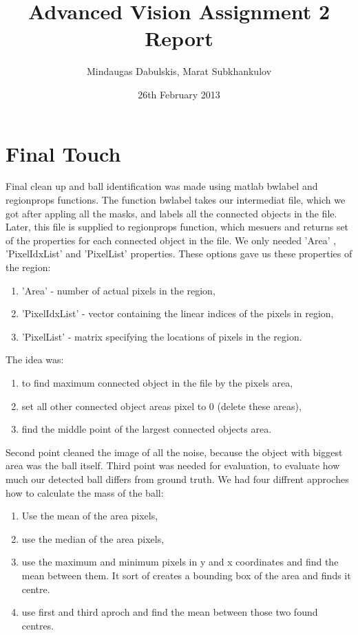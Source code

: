 \documentclass[10pt,a4paper,oneclumn]{article}
\title{Advanced Vision Assignment 2 Report}  %
\author{Mindaugas Dabulskis, Marat Subkhankulov}                      %
\date{26th February 2013}                 %
\begin{document}
\maketitle  %
%

\section{Final Touch}

Final clean up and ball identification was made using matlab bwlabel and regionprops functions. The function bwlabel takes our intermediat file, which we got after appling all the masks, and labels all the connected objects in the file. Later, this file is supplied to regionprops function, which mesuers and returns set of the properties for each connected object in the file. We only needed 'Area' , 'PixelIdxList' and 'PixelList' properties. These options gave us these properties of the region:
\begin{enumerate}
\item 'Area' - number of actual pixels in the region,
\item 'PixelIdxList' - vector containing the linear indices of the pixels in region,
\item 'PixelList' - matrix specifying the locations of pixels in the region.
\end{enumerate}

The idea was: 
\begin{enumerate}
\item to find maximum connected object in the file by the pixels area, 
\item set all other connected object areas pixel to 0 (delete these areas), 
\item find the middle point of the largest connected objects area. 
\end{enumerate}

Second point cleaned the image of all the noise, because the object with biggest area was the ball itself. Third point was needed for evaluation, to evaluate how much our detected ball differs from ground truth. We had four diffrent approches how to calculate the mass of the ball:

\begin{enumerate}
\item Use the mean of the area pixels,
\item use the median of the area pixels,
\item use the maximum and minimum pixels in y and x coordinates and find the mean between them. It sort of creates a bounding box of the area and finds it centre.
\item use first and third aproch and find the mean between those two found centres.
\end{enumerate}
\end{document}
